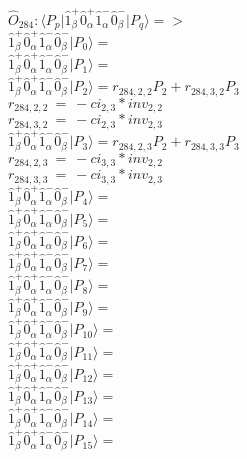 \documentclass[14pt]{article}
\begin{document}
    $\hat{O}_{284}:  \langle{P_p}\vert \hat{1}_{\beta}^{+}\hat{0}_{\alpha}^{+}\hat{1}_{\alpha}^{-}\hat{0}_{\beta}^{-} \vert{P_q}\rangle => $ \\ 
    $ \hat{1}_{\beta}^{+}\hat{0}_{\alpha}^{+}\hat{1}_{\alpha}^{-}\hat{0}_{\beta}^{-} \vert{P_{0}}\rangle =  $ \\ 
    $ \hat{1}_{\beta}^{+}\hat{0}_{\alpha}^{+}\hat{1}_{\alpha}^{-}\hat{0}_{\beta}^{-} \vert{P_{1}}\rangle =  $ \\ 
    $ \hat{1}_{\beta}^{+}\hat{0}_{\alpha}^{+}\hat{1}_{\alpha}^{-}\hat{0}_{\beta}^{-} \vert{P_{2}}\rangle = {r}_{284,2,2}P_{2}+{r}_{284,3,2}P_{3} $ \\ 
    ${r}_{284,2,2}\ =\ -{ci}_{2,3}*{inv}_{2,2} $ \\ 
    ${r}_{284,3,2}\ =\ -{ci}_{2,3}*{inv}_{2,3} $ \\ 
    $ \hat{1}_{\beta}^{+}\hat{0}_{\alpha}^{+}\hat{1}_{\alpha}^{-}\hat{0}_{\beta}^{-} \vert{P_{3}}\rangle = {r}_{284,2,3}P_{2}+{r}_{284,3,3}P_{3} $ \\ 
    ${r}_{284,2,3}\ =\ -{ci}_{3,3}*{inv}_{2,2} $ \\ 
    ${r}_{284,3,3}\ =\ -{ci}_{3,3}*{inv}_{2,3} $ \\ 
    $ \hat{1}_{\beta}^{+}\hat{0}_{\alpha}^{+}\hat{1}_{\alpha}^{-}\hat{0}_{\beta}^{-} \vert{P_{4}}\rangle =  $ \\ 
    $ \hat{1}_{\beta}^{+}\hat{0}_{\alpha}^{+}\hat{1}_{\alpha}^{-}\hat{0}_{\beta}^{-} \vert{P_{5}}\rangle =  $ \\ 
    $ \hat{1}_{\beta}^{+}\hat{0}_{\alpha}^{+}\hat{1}_{\alpha}^{-}\hat{0}_{\beta}^{-} \vert{P_{6}}\rangle =  $ \\ 
    $ \hat{1}_{\beta}^{+}\hat{0}_{\alpha}^{+}\hat{1}_{\alpha}^{-}\hat{0}_{\beta}^{-} \vert{P_{7}}\rangle =  $ \\ 
    $ \hat{1}_{\beta}^{+}\hat{0}_{\alpha}^{+}\hat{1}_{\alpha}^{-}\hat{0}_{\beta}^{-} \vert{P_{8}}\rangle =  $ \\ 
    $ \hat{1}_{\beta}^{+}\hat{0}_{\alpha}^{+}\hat{1}_{\alpha}^{-}\hat{0}_{\beta}^{-} \vert{P_{9}}\rangle =  $ \\ 
    $ \hat{1}_{\beta}^{+}\hat{0}_{\alpha}^{+}\hat{1}_{\alpha}^{-}\hat{0}_{\beta}^{-} \vert{P_{10}}\rangle =  $ \\ 
    $ \hat{1}_{\beta}^{+}\hat{0}_{\alpha}^{+}\hat{1}_{\alpha}^{-}\hat{0}_{\beta}^{-} \vert{P_{11}}\rangle =  $ \\ 
    $ \hat{1}_{\beta}^{+}\hat{0}_{\alpha}^{+}\hat{1}_{\alpha}^{-}\hat{0}_{\beta}^{-} \vert{P_{12}}\rangle =  $ \\ 
    $ \hat{1}_{\beta}^{+}\hat{0}_{\alpha}^{+}\hat{1}_{\alpha}^{-}\hat{0}_{\beta}^{-} \vert{P_{13}}\rangle =  $ \\ 
    $ \hat{1}_{\beta}^{+}\hat{0}_{\alpha}^{+}\hat{1}_{\alpha}^{-}\hat{0}_{\beta}^{-} \vert{P_{14}}\rangle =  $ \\ 
    $ \hat{1}_{\beta}^{+}\hat{0}_{\alpha}^{+}\hat{1}_{\alpha}^{-}\hat{0}_{\beta}^{-} \vert{P_{15}}\rangle =  $ \\ 
    
\end{document}
